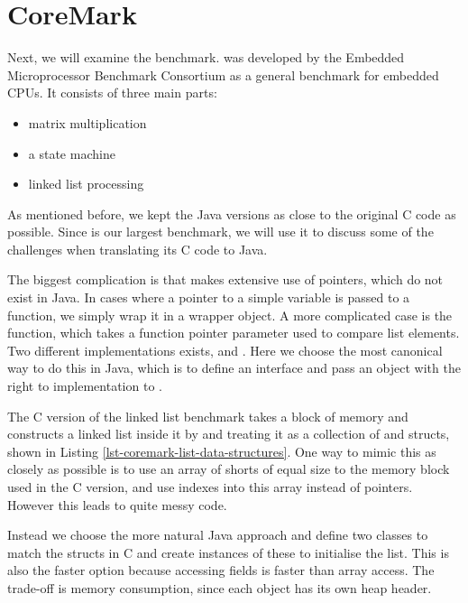 \section{CoreMark}
\label{sec-evaluation-coremark}

Next, we will examine the  benchmark.  was developed by the Embedded Microprocessor Benchmark Consortium as a general benchmark for embedded CPUs. It consists of three main parts:
\begin{itemize}
  \item matrix multiplication
  \item a state machine
  \item linked list processing
\end{itemize}

As mentioned before, we kept the Java versions as close to the original C code as possible. Since  is our largest benchmark, we will use it to discuss some of the challenges when translating its C code to Java.

The biggest complication is that  makes extensive use of pointers, which do not exist in Java. In cases where a pointer to a simple variable is passed to a function, we simply wrap it in a wrapper object. A more complicated case is the  function, which takes a function pointer parameter  used to compare list elements. Two different implementations exists,  and . Here we choose the most canonical way to do this in Java, which is to define an interface and pass an object with the right to implementation to .

The C version of the linked list benchmark takes a block of memory and constructs a linked list inside it by and treating it as a collection of  and  structs, shown in Listing \ref{lst-coremark-list-data-structures}. One way to mimic this as closely as possible is to use an array of shorts of equal size to the memory block used in the C version, and use indexes into this array instead of pointers. However this leads to quite messy code.

Instead we choose the more natural Java approach and define two classes to match the structs in C and create instances of these to initialise the list. This is also the faster option because accessing fields is faster than array access. The trade-off is memory consumption, since each object has its own heap header.

